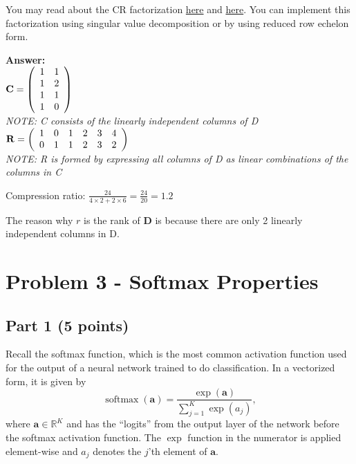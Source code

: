 \documentclass[11pt, oneside]{article}   	%
\begin{document}
You may read about the CR factorization \href{https://blogs.mathworks.com/cleve/2020/10/23/gil-strang-and-the-cr-matrix-factorization/}{here} and \href{https://en.wikipedia.org/wiki/Rank_factorization}{here}. You can implement this factorization using singular value decomposition or by using reduced row echelon form.

\textbf{Answer:} \\

$\mathbf{C} = 
\left( {\begin{array}{*{20}r}
    1 & 1 \\
    1 & 2 \\
    1 & 1 \\
    1 & 0 \\
 \end{array}} \right)
$ 
\\
\textit{NOTE: C consists of the linearly independent columns of D}
\\
$\mathbf{R} =
\left( {\begin{array}{*{20}r}
    1 & 0 & 1 & 2 & 3 & 4 \\
    0 & 1 & 1 & 2 & 3 & 2 \\
 \end{array}} \right)
$
\\
\textit{NOTE: R is formed by expressing all columns of D as linear combinations of the columns in C}

Compression ratio: $\frac{24}{4 \times 2 + 2 \times 6} = \frac{24}{20} = 1.2$

The reason why $r$ is the rank of $\mathbf{D}$ is because there are only 2 linearly independent columns in D.


\clearpage


\clearpage


\section*{Problem 3 - Softmax Properties}

\subsection*{Part 1 (5 points)}
Recall the softmax function, which is the most common activation function used for the output of a neural network trained to do classification. In a vectorized form, it is given by
\begin{equation*}
\operatorname{softmax} \left( {\mathbf{a}} \right) = \frac{{\exp \left( {\mathbf{a}} \right)}}
{{\sum\nolimits_{j = 1}^K {\exp \left( {a_j } \right)} }},
\end{equation*}
where $\mathbf{a}\in \mathbb{R}^K$ and has the ``logits'' from the output layer of the network before the softmax activation function. The $\exp$ function in the numerator is applied element-wise and $a_j$ denotes the $j$'th element of $\mathbf{a}$.
\end{document}
